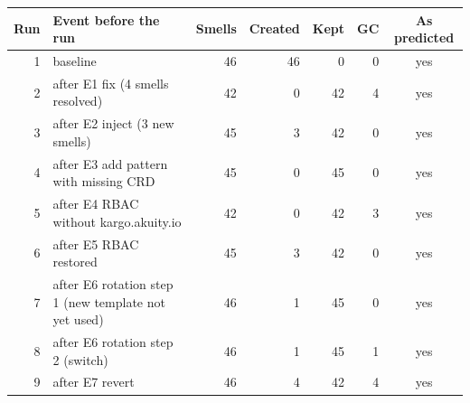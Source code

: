\begin{tabular}{rlrrrrc}
\toprule
Run & Event before the run & Smells & Created & Kept & GC & As predicted \\
\midrule
1 & baseline & 46 & 46 & 0 & 0 & yes \\
2 & after E1 fix (4 smells resolved) & 42 & 0 & 42 & 4 & yes \\
3 & after E2 inject (3 new smells) & 45 & 3 & 42 & 0 & yes \\
4 & after E3 add pattern with missing CRD & 45 & 0 & 45 & 0 & yes \\
5 & after E4 RBAC without kargo.akuity.io & 42 & 0 & 42 & 3 & yes \\
6 & after E5 RBAC restored & 45 & 3 & 42 & 0 & yes \\
7 & after E6 rotation step 1 (new template not yet used) & 46 & 1 & 45 & 0 & yes \\
8 & after E6 rotation step 2 (switch) & 46 & 1 & 45 & 1 & yes \\
9 & after E7 revert & 46 & 4 & 42 & 4 & yes \\
\bottomrule
\end{tabular}
